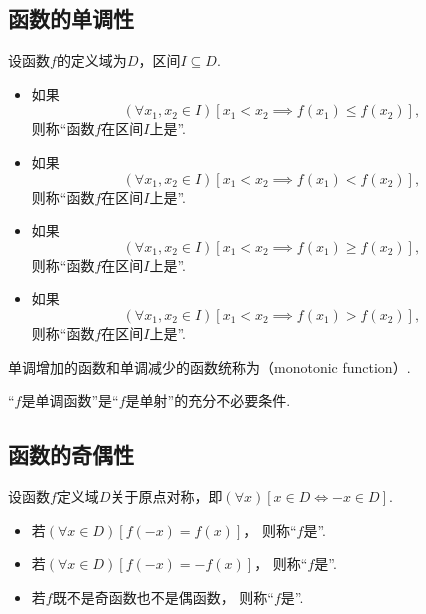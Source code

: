 \subsection{函数的单调性}
\begin{definition}
设函数\(f\)的定义域为\(D\)，区间\(I \subseteq D\).
\begin{itemize}
	\item 如果\[
		(\forall x_1,x_2\in I)
		[x_1 < x_2 \implies f(x_1) \leq f(x_2)],
	\]
	则称“函数\(f\)在区间\(I\)上是”.

	\item 如果\[
		(\forall x_1,x_2\in I)
		[x_1 < x_2 \implies f(x_1) < f(x_2)],
	\]
	则称“函数\(f\)在区间\(I\)上是”.

	\item 如果\[
		(\forall x_1,x_2\in I)
		[x_1 < x_2 \implies f(x_1) \geq f(x_2)],
	\]
	则称“函数\(f\)在区间\(I\)上是”.

	\item 如果\[
		(\forall x_1,x_2\in I)
		[x_1 < x_2 \implies f(x_1) > f(x_2)],
	\]
	则称“函数\(f\)在区间\(I\)上是”.
\end{itemize}

单调增加的函数和单调减少的函数统称为（monotonic function）.
\end{definition}

\begin{proposition}
“\(f\)是单调函数”是“\(f\)是单射”的充分不必要条件.
\end{proposition}

\subsection{函数的奇偶性}
\begin{definition}
设函数\(f\)定义域\(D\)关于原点对称，即\((\forall x)[x \in D \iff -x \in D]\).
\begin{itemize}
	\item 若\((\forall x \in D)
	[f(-x) = f(x)]\)，
	则称“\(f\)是”.

	\item 若\((\forall x \in D)
	[f(-x) = -f(x)]\)，
	则称“\(f\)是”.

	\item 若\(f\)既不是奇函数也不是偶函数，
	则称“\(f\)是”.
\end{itemize}
\end{definition}

